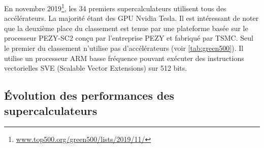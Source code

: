         En novembre 2019\footnote{\url{www.top500.org/green500/lists/2019/11/}}, les 34 premiers supercalculateurs utilisent tous des accélérateurs. La majorité étant des GPU Nvidia Tesla. Il est intéressant de noter que la deuxième place du classement est tenue par une plateforme basée sur le processeur PEZY-SC2 conçu par l'entreprise PEZY et fabriqué par TSMC. Seul le premier du classement n'utilise pas d'accélérateurs (voir \autoref{tab:green500}). Il utilise un processeur ARM basse fréquence pouvant exécuter des instructions vectorielles SVE (Scalable Vector Extensions) sur 512 bits.

        
        \begin{table}[]
            \centering
            \caption{Classement du Green500 de novembre 2019 selon l'efficacité énergétique (en gigaFLOPS/Watts). Les puissances Rpeak (puissance théorique) et Rmax (puissance mesurée par HPL) sont données en pétaFLOPS ($10^{15}$ FLOPS).}
            \label{tab:green500}
        \end{table}
        
        
\subsection{Évolution des performances des supercalculateurs}


